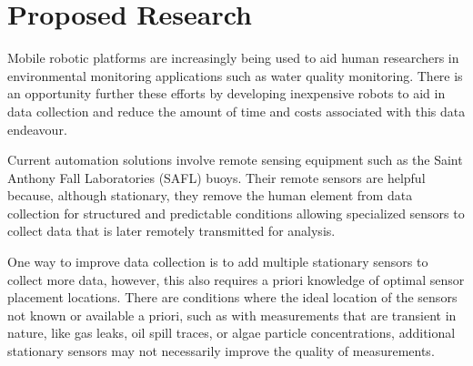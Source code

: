 \section{Proposed Research} 




	Mobile robotic platforms are increasingly being used to aid human researchers in environmental monitoring applications such as water quality monitoring. There is an opportunity further these efforts by developing inexpensive robots to aid in data collection and reduce the amount of time and costs associated with this data endeavour. 

	Current automation solutions involve remote sensing equipment such as the Saint Anthony Fall Laboratories (SAFL) buoys. Their remote sensors are helpful because, although stationary, they remove the human element from data collection for structured and predictable conditions allowing specialized sensors to collect data that is later remotely transmitted for analysis. 

	One way to improve data collection is to add multiple stationary sensors to collect more data, however, this also requires a priori knowledge of optimal sensor placement locations. There are conditions where the ideal location of the sensors not known or available a priori, such as with measurements that are transient in nature, like gas leaks, oil spill traces, or algae particle concentrations, additional stationary sensors may not necessarily improve the quality of measurements. 

